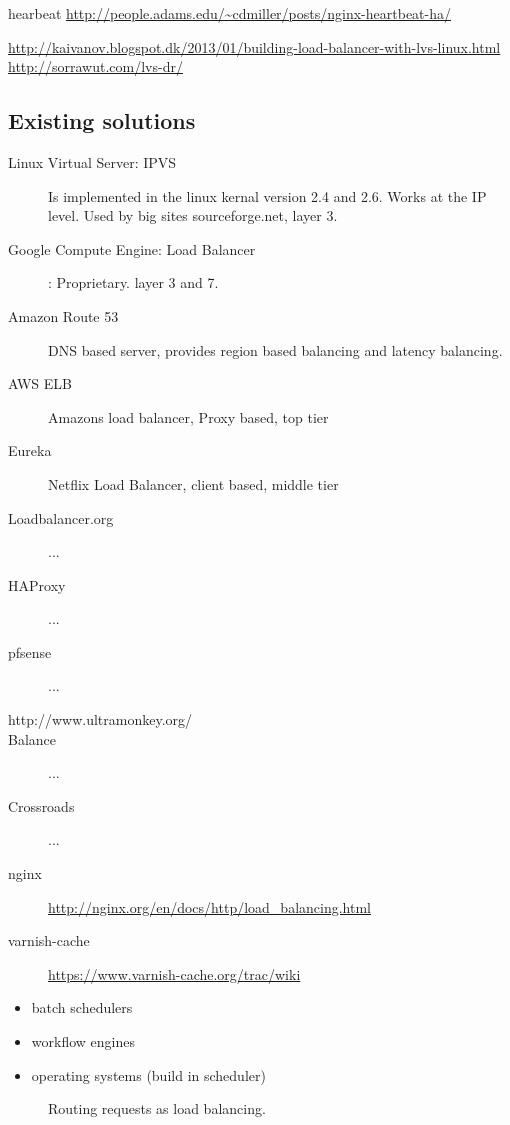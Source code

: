 hearbeat 	\url{http://people.adams.edu/~cdmiller/posts/nginx-heartbeat-ha/}

\url{http://kaivanov.blogspot.dk/2013/01/building-load-balancer-with-lvs-linux.html}
\url{http://sorrawut.com/lvs-dr/}
\subsection{Existing solutions}
\begin{description}
	\item [Linux Virtual Server: IPVS] Is implemented in the linux kernal version 2.4 and 2.6. Works at the IP level. Used by big sites sourceforge.net, layer 3.
	\item [Google Compute Engine: Load Balancer]: Proprietary. layer 3 and 7.
	\item [Amazon Route 53] DNS based server, provides region based balancing and latency balancing.
	\item [AWS ELB] Amazons load balancer, Proxy based, top tier
	\item [Eureka] Netflix Load Balancer, client based, middle tier

	\item [Loadbalancer.org] ...
	\item [HAProxy] ...
	\item [pfsense] ...
	\item [http://www.ultramonkey.org/]
	\item [Balance] ...
	\item [Crossroads] ...
	\item [nginx] \url{http://nginx.org/en/docs/http/load_balancing.html}
	\item [varnish-cache] \url{https://www.varnish-cache.org/trac/wiki}
\end{description}

\begin{itemize}
	\item batch schedulers
	\item workflow engines
	\item operating systems (build in scheduler)
\end{itemize}

\begin{figure}
	\centering	
	\scalebox{0.7}{}
	\caption[Routing requests as load balancing]{
		\label{fig:RoutingloadBalancingSetup} 
		\footnotesize{%
			Routing requests as load balancing.
		}
	}
\end{figure}

